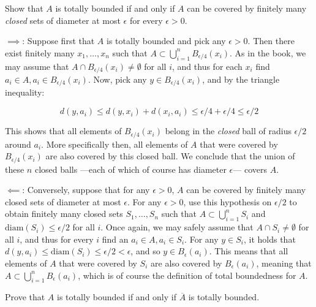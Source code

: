 \begin{exercise}{4}
    Show that $A$ is totally bounded if and only if $A$ can be covered by finitely many \textit{closed} sets of diameter at most $\epsilon$ for every $\epsilon > 0$.
\end{exercise}

\begin{solution}
    
    $\implies$: Suppose first that $A$ is totally bounded and pick any $\epsilon > 0$.
    Then there exist finitely many $x_1, \ldots, x_n$ such that $A \subset \bigcup_{i=1}^{n} B_{\epsilon/4}(x_i)$.
    As in the book, we may assume that $A \cap B_{\epsilon/4}(x_i) \neq \emptyset$ for all $i$, and thus for each $x_i$ find $a_i \in A, a_i \in B_{\epsilon/4}(x_i)$.
    Now, pick any $y \in B_{\epsilon/4}(x_i)$, and by the triangle inequality:

    \[d(y, a_i) \leq d(y, x_i) + d(x_i, a_i) \leq \epsilon/4 + \epsilon/4 \leq \epsilon/2\]

    This shows that all elements of $B_{\epsilon/4}(x_i)$ belong in the \textit{closed} ball of radius $\epsilon/2$ around $a_i$.
    More specifically then, all elements of $A$ that were covered by $B_{\epsilon/4}(x_i)$ are also covered by this closed ball.
    We conclude that the union of these $n$ closed balls ---each of which of course has diameter $\epsilon$--- covers $A$.

    $\impliedby$: Conversely, suppose that for any $\epsilon > 0$, $A$ can be covered by finitely many closed sets of diameter at most $\epsilon$.
    For any $\epsilon > 0$, use this hypothesis on $\epsilon/2$ to obtain finitely many closed sets $S_1, \ldots, S_n$ such that $A \subset \bigcup_{i=1}^{n} S_i$ and $\text{diam}(S_i) \leq \epsilon/2$ for all $i$.
    Once again, we may safely assume that $A \cap S_i \neq \emptyset$ for all $i$, and thus for every $i$ find an $a_i \in A, a_i \in S_i$.
    For any $y \in S_i$, it holds that $d(y, a_i) \leq \text{diam}(S_i) \leq \epsilon/2 < \epsilon$, and so $y \in B_{\epsilon}(a_i)$.
    This means that all elements of $A$ that were covered by $S_i$ are also covered by $B_{\epsilon}(a_i)$, meaning that $A \subset \bigcup_{i=1}^{n} B_{\epsilon}(a_i)$, which is of course the definition of total boundedness for $A$.
\end{solution}

\begin{exercise}{5}
    Prove that $A$ is totally bounded if and only if $\overline{A}$ is totally bounded.
\end{exercise}

